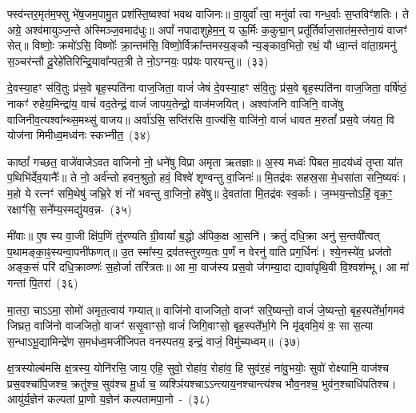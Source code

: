 फ्स्व॑न्तर॒मृत॑म॒फ्सु भे॑ष॒जम॒पामु॒त प्रश॑स्ति॒ष्वश्वा॑ भवथ वाजिनः॥ वा॒युर्वा᳚ त्वा॒ मनु॑र्वा त्वा गन्ध॒र्वाः स॒प्तविꣳ॑शतिः। ते अग्रे॒ अश्व॑मायुञ्ज॒न्ते अ॑स्मिञ्ज॒वमाद॑धुः॥ अपां᳚ नपादाशुहेम॒न्॒ य ऊ॒र्मिः क॒कुद्मा॒न् प्रतू᳚र्तिर्वाज॒सात॑म॒स्तेना॒यं वाजꣳ॑ सेत्॥ विष्णोः॒ क्रमो॑\-ऽसि॒ विष्णोः᳚ क्रा॒न्तम॑सि॒ विष्णो॒र्विक्रा᳚न्तमस्य॒ङ्कौ न्य॒ङ्काव॒भितो॒ रथं॒ यौ ध्वा॒न्तं वा॑ता॒ग्रमनु॑ स॒ञ्चर॑न्तौ दू॒रेहे॑तिरिन्द्रि॒यावा᳚न्पत॒त्री ते नो॒\-ऽग्नयः॒ पप्र॑यः पारयन्तु॥~(३३)\ip

{\anuvakamend[{अ॒फ्सु न्य॒ङ्कौ पञ्च॑दश च}]}

दे॒वस्या॒हꣳ स॑वि॒तुः प्र॑स॒वे बृह॒स्पति॑ना वाज॒जिता॒ वाजं॑ जेषं दे॒वस्या॒हꣳ स॑वि॒तुः प्र॑स॒वे बृह॒स्पति॑ना वाज॒जिता॒ वर्\mbox{}षि॑ष्ठं॒ नाकꣳ॑ रुहेय॒मिन्द्रा॑य॒ वाचं॑ वद॒तेन्द्रं॒ वाजं॑ जापय॒तेन्द्रो॒ वाज॑मजयित्। अश्वा॑जनि वाजिनि॒ वाजे॑षु वाजिनीव॒त्यश्वा᳚न्थ्स॒मथ्सु॑ वाजय॥ अर्वा॑\-ऽसि॒ सप्ति॑रसि वा॒ज्य॑सि॒ वाजि॑नो॒ वाजं॑ धावत म॒रुतां᳚ प्रस॒वे ज॑यत॒ वि योज॑ना मिमीध्व॒मध्व॑नः स्कभ्नीत॒~(३४)\ip

काष्ठां᳚ गच्छत॒ वाजे॑वाजे\-ऽवत वाजिनो नो॒ धने॑षु विप्रा अमृता ऋतज्ञाः॥ अ॒स्य मध्वः॑ पिबत मा॒दय॑ध्वं तृ॒प्ता या॑त प॒थिभि॑र्देव॒यानैः᳚॥ ते नो॒ अर्व॑न्तो हवन॒श्रुतो॒ हवं॒ विश्वे॑ शृण्वन्तु वा॒जिनः॑॥ मि॒तद्र॑वः सहस्र॒सा मे॒धसा॑ता सनि॒ष्यवः॑। म॒हो ये रत्नꣳ॑ समि॒थेषु॑ जभ्रि॒रे शं नो॑ भवन्तु वा॒जिनो॒ हवे॑षु॥ दे॒वता॑ता मि॒तद्र॑वः स्व॒र्काः। ज॒म्भय॒न्तो\-ऽहिं॒ वृक॒ꣳ॒ रक्षाꣳ॑सि॒ सने᳚म्य॒स्मद्यु॑यव॒न्न-~(३५)\ip

मी॑वाः॥ ए॒ष स्य वा॒जी क्षि॑प॒णिं तु॑रण्यति ग्री॒वायां᳚ ब॒द्धो अ॑पिक॒क्ष आ॒सनि॑। क्रतुं॑ दधि॒क्रा अनु॑ स॒न्तवी᳚त्वत् प॒थामङ्का॒ꣴ॒स्यन्वा॒पनी॑फणत्॥ उ॒त स्मा᳚स्य॒ द्रव॑तस्तुरण्य॒तः प॒र्णं न वेरनु॑ वाति प्रग॒र्धिनः॑। श्ये॒नस्ये॑व॒ ध्रज॑तो अङ्क॒सं परि॑ दधि॒क्राव्ण्णः॑ स॒होर्जा तरि॑त्रतः॥ आ मा॒ वाज॑स्य प्रस॒वो ज॑गम्या॒दा द्यावा॑\-पृथि॒वी वि॒श्वश॑म्भू। आ मा॑ गन्तां पि॒तरा॑~(३६)\ip

मा॒तरा॒ चा\-ऽऽ\-मा॒ सोमो॑ अमृत॒त्वाय॑ गम्यात्॥ वाजि॑नो वाजजितो॒ वाजꣳ॑ सरि॒ष्यन्तो॒ वाजं॑ जे॒ष्यन्तो॒ बृह॒स्पते᳚र्भा॒गमव॑ जिघ्रत॒ वाजि॑नो वाजजितो॒ वाजꣳ॑ ससृ॒वाꣳसो॒ वाजं॑ जिगि॒वाꣳसो॒ बृह॒स्पते᳚र्भा॒गे नि मृ॑ढ्वमि॒यं वः॒ सा स॒त्या स॒न्धा\-ऽभू॒द्यामिन्द्रे॑ण स॒मध॑ध्व॒मजी॑जिपत वनस्पतय॒ इन्द्रं॒ वाजं॒ विमु॑च्यध्वम्॥~(३७)\ip

{\anuvakamend[{स्क॒भ्नी॒त॒ यु॒य॒व॒न्पि॒तरा॒ द्विच॑त्वारिꣳशच्च}]}

क्ष॒त्रस्योल्ब॑मसि क्ष॒त्रस्य॒ योनि॑रसि॒ जाय॒ एहि॒ सुवो॒ रोहा॑व॒ रोहा॑व॒ हि सुव॑र॒हं ना॑वु॒भयोः॒ सुवो॑ रोक्ष्यामि॒ वाज॑श्च प्रस॒वश्चा॑पि॒जश्च॒ क्रतु॑श्च॒ सुव॑श्च मू॒र्धा च॒ व्यश्ञि॑यश्चा\-ऽऽ\-न्त्याय॒नश्चान्त्य॑श्च भौव॒नश्च॒ भुव॑न॒श्चाधि॑\-पतिश्च। आयु॑र्य॒ज्ञेन॑ कल्पतां प्रा॒णो य॒ज्ञेन॑ कल्पतामपा॒नो~-~(३८)\ip

